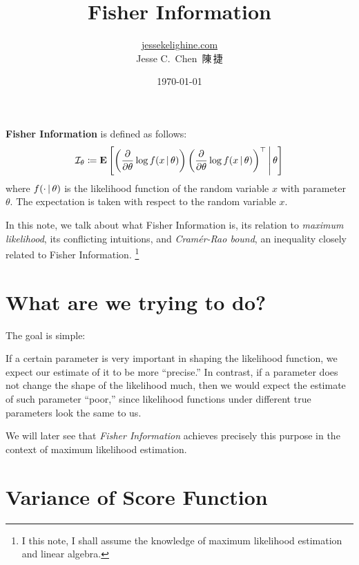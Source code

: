 \documentclass[a4paper]{article}
\title{Fisher Information}
\author{\href{https://jessekelighine.com}{jessekelighine.com}\\Jesse C.\ Chen\ 陳\,捷}
\date{\today}
\begin{document}
\maketitle

\noindent
\textbf{Fisher Information} is defined as follows:
\begin{align*}
	\mathcal{I}_{\theta}
	\coloneqq
	\E
	\left[
	\left(
	\frac{\partial}{\partial\theta}\log f(x\given\theta)
	\right)
	\left(
	\frac{\partial}{\partial\theta}\log f(x\given\theta)
	\right)\T
	\given[\middle]
	\theta
	\right]
\end{align*}
where $f(\cdot\given\theta)$ is the likelihood function of the random variable $x$ with parameter $\theta$.
The expectation is taken with respect to the random variable $x$.

In this note,
we talk about what Fisher Information is,
its relation to \emph{maximum likelihood},
its conflicting intuitions,
and \emph{Cramér-Rao bound}, an inequality closely related to Fisher Information.
\footnote{
	I this note, I shall assume the knowledge of maximum likelihood estimation and linear algebra.
}

\section{What are we trying to do?}

The goal is simple:
\begin{quote}
\end{quote}
If a certain parameter is very important in shaping the likelihood function,
we expect our estimate of it to be more ``precise.''
In contrast, if a parameter does not change the shape of the likelihood much,
then we would expect the estimate of such parameter ``poor,''
since likelihood functions under different true parameters look the same to us.

We will later see that \emph{Fisher Information} achieves precisely this purpose
in the context of maximum likelihood estimation.

\section{Variance of Score Function}
\end{document}
